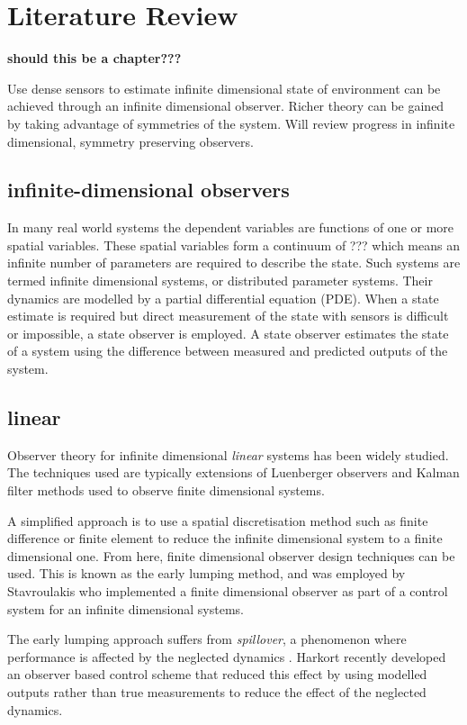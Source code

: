 \section{Literature Review}
\textbf{should this be a chapter???}

Use dense sensors to estimate infinite dimensional state of environment can be achieved through an infinite dimensional observer. Richer theory can be gained by taking advantage of symmetries of the system. Will review progress in infinite dimensional, symmetry preserving observers.

\subsection{infinite-dimensional observers}
In many real world systems the dependent variables are functions of one or more spatial variables. These spatial variables form a continuum of ??? which means an infinite number of parameters are required to describe the state. Such systems are termed infinite dimensional systems, or distributed parameter systems. Their dynamics are modelled by a partial differential equation (PDE). When a state estimate is required but direct measurement of the state with sensors is difficult or impossible, a state observer is employed. A state observer estimates the state of a system using the difference between measured and predicted outputs of the system.

\subsection{linear}
Observer theory for infinite dimensional \textit{linear} systems has been widely studied. The techniques used are typically extensions of Luenberger observers and Kalman filter methods used to observe finite dimensional systems.

A simplified approach is to use a spatial discretisation method such as finite difference or finite element to reduce the infinite dimensional system to a finite dimensional one. From here, finite dimensional observer design techniques can be used. This is known as the early lumping method, and was employed by Stavroulakis \cite{stavroulakis1973design} who implemented a finite dimensional observer as part of a control system for an infinite dimensional systems.

The early lumping approach suffers from \textit{spillover}, a phenomenon where performance is affected by the neglected dynamics \cite{meirovitch1983problem}. Harkort \cite{harkort2011finite} recently developed an observer based control scheme that reduced this effect by using modelled outputs rather than true measurements to reduce the effect of the neglected dynamics.

